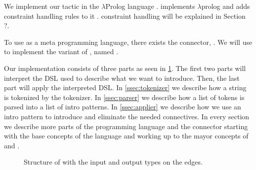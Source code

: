 \documentclass[thesis.tex]{subfiles}
\begin{document}
{We implement our tactic in the $\lambda$Prolog language \elpi \cite{dunchevELPIFastEmbeddable2015,guidiImplementingTypeTheory2019}. \elpi implements $\lambda$prolog \cite{millerHigherorderLogicProgramming1986,millerUniformProofsFoundation1991,belleanneePragmaticReconstructionLProlog1999,millerProgrammingHigherOrderLogic2012} and adds constraint handling rules to it \cite{monfroyConstraintHandlingRules2011}. constraint handling will be explained in Section ?.

To use \elpi as a \coq meta programming language, there exists the \elpi \coq connector, \ce \cite{tassiElpiExtensionLanguage2018}. We will use \ce to implement the \elpi variant of , named .

Our \elpi implementation  consists of three parts as seen in \cref{fig:eiintrosstruct}. The first two parts will interpret the DSL used to describe what we want to introduce. Then, the last part will apply the interpreted DSL. In \cref{ssec:tokenizer} we describe how a string is tokenized by the tokenizer. In \cref{ssec:parser} we describe how a list of tokens is parsed into a list of intro patterns. In \cref{ssec:applier} we describe how we use an intro pattern to introduce and eliminate the needed connectives. In every section we describe more parts of the \elpi programming language and the \ce connector starting with the base concepts of the language and working up to the mayor concepts of \elpi and \ce.
\begin{figure}
  \centering
  \caption{Structure of  with the input and output types on the edges.}
  \label{fig:eiintrosstruct}
\end{figure}

}
\end{document}
